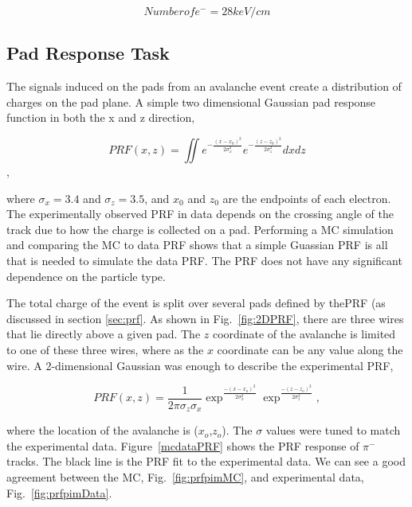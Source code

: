 \begin{equation}
Number of e^{-} = 28 keV/cm
\label{eq:kev2el}
\end{equation}

\subsection{Pad Response Task}

The signals induced on the pads from an avalanche event create a distribution of charges on the pad plane. A simple two dimensional Gaussian pad response function in both the x and z direction,

\begin{equation}
PRF(x,z) = \iint e^{-\frac{(x-x_0)^2}{2\sigma_x^2}} e^{-\frac{(z-z_0)^2}{2\sigma_z^2}}dxdz
\end{equation},

where $\sigma_x = 3.4$ and $\sigma_z = 3.5$, and $x_0$ and $z_0$ are the endpoints of each electron. The experimentally observed PRF in data depends on the crossing angle of the track due to how the charge is collected on a pad. Performing a MC simulation and comparing the MC to data PRF shows that a simple Guassian PRF is all that is needed to simulate the data PRF. The PRF does not have any significant dependence on the particle type. 







The total charge of the event is split over several pads defined by thePRF (as discussed in section \ref{sec:prf}. As shown in Fig.~\ref{fig:2DPRF}, there are three wires that lie directly above a given pad. The $z$ coordinate of the avalanche is limited to one of these three wires, where as the $x$ coordinate can be any value along the wire. A 2-dimensional Gaussian was enough to describe the experimental PRF, 

\begin{equation}
PRF(x,z) = \frac{1}{2\pi\sigma_z\sigma_x}\exp^{\frac{-{(x-x_o)}^2}{2\sigma_x^2}}\exp^{\frac{-{(z-z_o)}^2}{2\sigma_z^2}},
\label{eq:2DPRF}
\end{equation}

where the location of the avalanche is ($x_o$,$z_o$). The $\sigma$ values were tuned to match the experimental data. Figure~\ref{mcdataPRF} shows the PRF response of $\pi^-$ tracks. The black line is the PRF fit to the experimental data. We can see a good agreement between the MC, Fig.~\ref{fig:prfpimMC}, and experimental data, Fig.~\ref{fig:prfpimData}.



